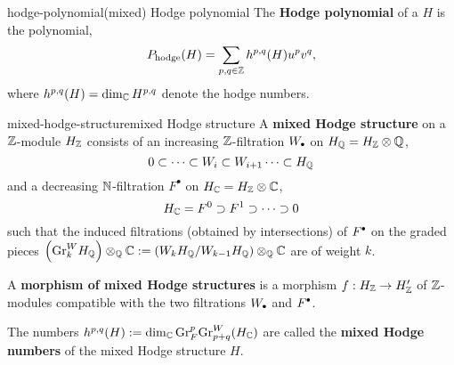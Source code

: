 \begin{topic}{hodge-polynomial}{(mixed) Hodge polynomial}
    The \textbf{Hodge polynomial} of a  $H$ is the polynomial,
    \[ P_\textup{hodge}(H) = \sum_{p, q \in \mathbb{Z}} h^{p, q}(H) u^p v^q , \]
    where $h^{p, q}(H) = \dim_{\mathbb{C}} H^{p, q}$ denote the hodge numbers.
\end{topic}

\begin{topic}{mixed-hodge-structure}{mixed Hodge structure}
    A \textbf{mixed Hodge structure} on a $\mathbb{Z}$-module $H_{\mathbb{Z}}$ consists of an increasing $\mathbb{Z}$-filtration $W_\bdot$ on $H_{\mathbb{Q}} = H_{\mathbb{Z}} \otimes \mathbb{Q}$,
    \[ 0 \subset \cdots \subset W_i \subset W_{i + 1} \cdots \subset H_{\mathbb{Q}} \]
    and a decreasing $\mathbb{N}$-filtration $F^\bullet$ on $H_{\mathbb{C}} = H_{\mathbb{Z}} \otimes \mathbb{C}$,
    \[ H_{\mathbb{C}} = F^0 \supset F^1 \supset \cdots \supset 0 \]
    such that the induced filtrations (obtained by intersections) of $F^\bdot$ on the graded pieces $\left(\text{Gr}^W_k H_{\mathbb{Q}}\right) \otimes_{\mathbb{Q}} \mathbb{C} := \left(W_k H_{\mathbb{Q}} / W_{k - 1} H_{\mathbb{Q}}\right) \otimes_{\mathbb{Q}} \mathbb{C}$ are  of weight $k$.
    
    A \textbf{morphism of mixed Hodge structures} is a morphism $f : H_{\mathbb{Z}} \to H'_{\mathbb{Z}}$ of $\mathbb{Z}$-modules compatible with the two filtrations $W_\bdot$ and $F^\bdot$.
    
    The numbers $h^{p, q}(H) := \dim_{\mathbb{C}} \textup{Gr}_F^p \textup{Gr}^W_{p + q}(H_{\mathbb{C}})$ are called the \textbf{mixed Hodge numbers} of the mixed Hodge structure $H$.
\end{topic}
